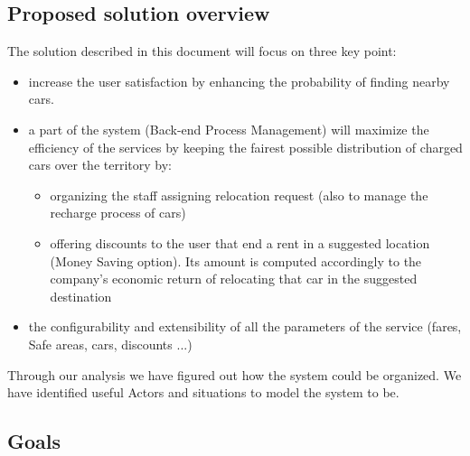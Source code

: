 \documentclass[english]{article}
\begin{document}
\subsection{Proposed solution overview}
The solution described in this document will focus on three key point:
\begin{itemize}
	\item{increase the user satisfaction by enhancing the probability of finding nearby cars.}
	\item{a part of the system (Back-end Process Management) will maximize the efficiency of the services by keeping the fairest possible distribution of charged cars over the territory by: 
		\begin{itemize}
			\item{organizing the staff assigning relocation request (also to manage the recharge process of cars)}
			\item{offering discounts to the user that end a rent in a suggested location (Money Saving option). Its amount is computed accordingly to the company's economic return of relocating that car in the suggested destination
			}
		\end{itemize}
	}
	\item{the configurability and extensibility of all the parameters of the service (fares, Safe areas, cars, discounts ...) }
\end{itemize}

Through our analysis we have figured out how the system could be organized.
We have identified useful Actors and situations to model the system to be.


	
	\subsection{Goals}
\end{document}
